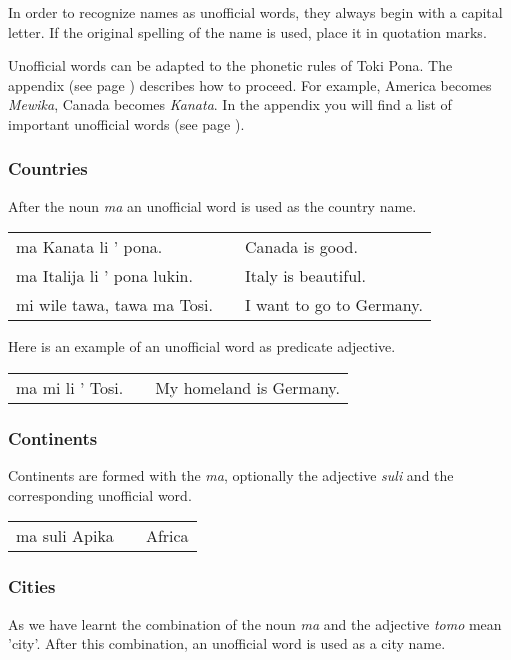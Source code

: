 In order to recognize names as unofficial words, they always begin with a capital letter. 
If the original spelling of the name is used, place it in quotation marks.

Unofficial words can be adapted to the phonetic rules of Toki Pona.
The appendix (see page \pageref{'phonet_trans'}) describes how to proceed.
For example, America becomes \textit{Mewika}, Canada becomes \textit{Kanata}.
In the appendix you will find a list of important unofficial words (see page \pageref{'unofficial_words'}). 
%
\subsubsection*{Countries}
%
After the noun \textit{ma} an unofficial word is used as the country name. 

\begin{supertabular}{p{5,5cm}|ll}
ma Kanata li ' pona. && Canada is good. \\
ma Italija li ' pona lukin. && Italy is beautiful. \\
mi wile tawa, tawa ma Tosi. && I want to go to Germany. \\
\end{supertabular} 

Here is an example of an unofficial word as predicate adjective.

\begin{supertabular}{p{5,5cm}|ll}
ma mi li ' Tosi. && My homeland is Germany.  \\
\end{supertabular}

%
\subsubsection*{Continents}
%
Continents are formed with the \textit{ma}, optionally the adjective \textit{suli} and the corresponding unofficial word. 

\begin{supertabular}{p{2,5cm}|ll}
ma suli Apika && Africa \\
\end{supertabular}

%
\subsubsection*{Cities}
%
As we have learnt the combination of the noun \textit{ma} and the adjective \textit{tomo} mean 'city'.
After this combination, an unofficial word is used as a city name. 

